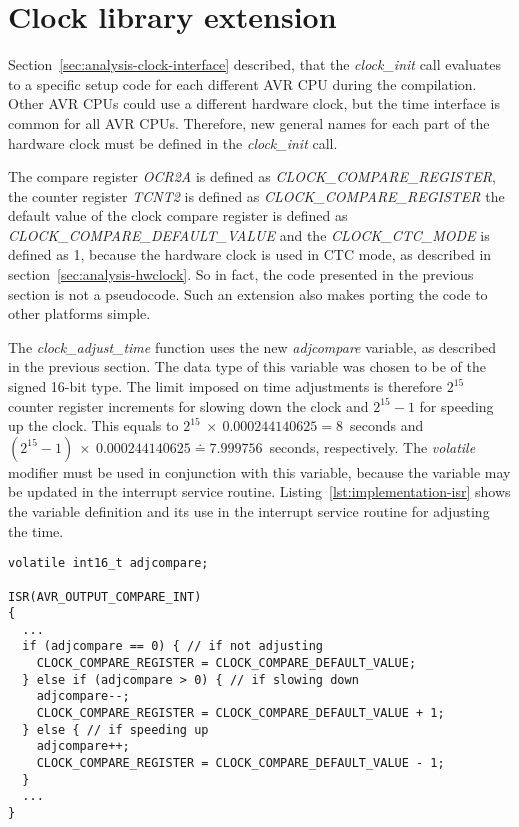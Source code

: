 
\section{Clock library extension}\label{sec:implementation-clock}
Section~\ref{sec:analysis-clock-interface} described, that
the {\it{clock\_init}} call evaluates to a specific setup code
for each different AVR CPU during the compilation.
Other AVR CPUs could use a different hardware clock,
but the time interface is common for all AVR CPUs.
Therefore, new general names for each part of the hardware clock
must be defined in the {\it{clock\_init}} call.

The compare register {\it{OCR2A}} is defined as {\it{CLOCK\_COMPARE\_REGISTER}},
the counter register {\it{TCNT2}} is defined as {\it{CLOCK\_COMPARE\_REGISTER}}
the default value of the clock compare register is defined as {\it{CLOCK\_COMPARE\_DEFAULT\_VALUE}}
and the {\it{CLOCK\_CTC\_MODE}} is defined as 1, because the hardware clock is used in CTC mode,
as described in section~\ref{sec:analysis-hwclock}.
So in fact, the code presented in the previous section is not a pseudocode.
Such an extension also makes porting the code to other platforms simple.

The {\it{clock\_adjust\_time}} function uses the new {\it{adjcompare}} variable,
as described in the previous section.
The data type of this variable was chosen to be of the signed 16-bit type.
The limit imposed on time adjustments is therefore $2^{15}$ counter register increments %
for slowing down the clock and $2^{15}-1$ for speeding up the clock.
This equals to $2^{15}~\times~0.000244140625 = 8$~seconds
and $(2^{15} - 1)~\times~0.000244140625 \doteq 7.999756$~seconds, respectively.
The {\it{volatile}} modifier must be used in conjunction with this variable,
because the variable may be updated in the interrupt service routine.
Listing~\ref{lst:implementation-isr} shows the variable definition
and its use in the interrupt service routine for adjusting the time.
\begin{lstlisting}[caption={Adjustments pseudocode in interrupt service routine},label={lst:implementation-isr}]
volatile int16_t adjcompare;

ISR(AVR_OUTPUT_COMPARE_INT)
{
  ...
  if (adjcompare == 0) { // if not adjusting
    CLOCK_COMPARE_REGISTER = CLOCK_COMPARE_DEFAULT_VALUE;
  } else if (adjcompare > 0) { // if slowing down
    adjcompare--;
    CLOCK_COMPARE_REGISTER = CLOCK_COMPARE_DEFAULT_VALUE + 1;
  } else { // if speeding up
    adjcompare++;
    CLOCK_COMPARE_REGISTER = CLOCK_COMPARE_DEFAULT_VALUE - 1;
  }
  ...
}
\end{lstlisting}
